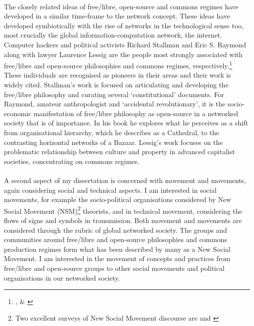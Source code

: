 \paragraph{}The closely related ideas of free/libre, open-source and commons regimes have developed in a similar time-frame to the network concept. These ideas have developed symbiotically with the rise of networks in the technological sense too, most crucially the global information-computation network, the internet. Computer hackers and political activists Richard Stallman and Eric S. Raymond along with lawyer Laurence Lessig are the people most strongly associated with free/libre and open-source philosophies and commons regimes, respectively.\footnote{\cite{Stallman:2002xy}, \cite{raymond:1999catb} \& \cite{Lessig:2004pi}} These individuals are recognised as pioneers in their areas and their work is widely cited. Stallman's work is focused on articulating and developing the free/libre philosophy and curating several `constitutional' documents. For Raymond, amateur anthropologist and `accidental revolutionary', it is the socio-economic manifestation of free/libre philosophy as open-source in a networked society that is of importance. In his book he explores what he perceives as a shift from organisational hierarchy, which he describes as a Cathedral, to the contrasting horizontal networks of a Bazaar. Lessig's work focuses on the problematic relationship between culture and property in advanced capitalist societies, concentrating on commons regimes.

\paragraph{}A second aspect of my dissertation is concerned with movement and movements, again considering social and technical aspects. I am interested in social movements, for example the socio-political organisations considered by New Social Movement (NSM)\footnote{Two excellent surveys of New Social Movement discourse are \cite{daltonetal1990} and \cite{Porta:2006kx}} theorists, and in technical movement, considering the flows of signs and symbols in transmission. Both movement and movements are considered through the rubric of global networked society. The groups and communities around free/libre and open-source philosophies and commons production regimes form what has been described by many as a New Social Movement. I am interested in the movement of concepts and practices from free/libre and open-source groups to other social movements and political organisations in our networked society.

